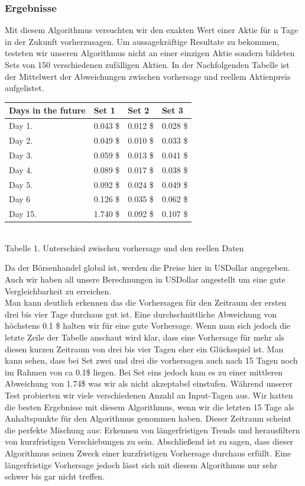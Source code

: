 \documentclass[12pt]{article} %
\begin{document}
\subsubsection{Ergebnisse}

Mit diesem Algorithmus versuchten wir den exakten Wert einer Aktie für n Tage in der Zukunft vorherzusagen. Um aussagekräftige Resultate zu bekommen, testeten wir unseren Algorithmus nicht an einer einzigen Aktie sondern bildeten Sets von 150 verschiedenen zufälligen Aktien. In der Nachfolgenden Tabelle ist der Mittelwert der Abweichungen zwischen vorhersage und reellem Aktienpreis aufgelistet.
\begin{center}
\begin{tabularx}{\textwidth}{|X|X|X|X|}
\hline
Days in the future & Set 1 & Set 2 & Set 3\\
\hline
\hline
Day 1. & 0.043 \$ & 0.012 \$ & 0.028 \$\\
\hline
Day 2. & 0.049 \$ & 0.010 \$ & 0.033 \$\\
\hline
Day 3. & 0.059 \$ & 0.013 \$ & 0.041 \$\\
\hline
Day 4. & 0.089 \$ & 0.017 \$ & 0.038 \$\\
\hline
Day 5. & 0.092 \$ & 0.024 \$ & 0.049 \$\\
\hline
Day 6 & 0.126 \$ & 0.035 \$ & 0.062 \$\\
\hline
\hline
Day 15. & 1.740 \$ & 0.092 \$ & 0.107 \$\\
\hline

\end{tabularx}
\\[5pt]
Tabelle 1. Unterschied zwischen vorhersage und den reellen Daten
\end{center}

Da der Börsenhandel global ist, werden die Preise hier in USDollar angegeben. Auch wir haben all unsere Berechnungen in USDollar angestellt um eine gute Vergleichbarkeit zu erreichen.
\\
Man kann deutlich erkennen das die Vorhersagen für den Zeitraum der ersten drei bis vier Tage durchaus gut ist. Eine durchschnittliche Abweichung von höchstens 0.1 \$ halten wir für eine gute Vorhersage. Wenn man sich jedoch die letzte Zeile der Tabelle anschaut wird klar, dass eine Vorhersage für mehr als diesen kurzen Zeitraum von drei bis vier Tagen eher ein Glücksspiel ist. Man kann sehen, dass bei Set zwei und drei die vorhersagen auch nach 15 Tagen noch im Rahmen von ca 0.1\$ liegen. Bei Set eins jedoch kam es zu einer mittleren Abweichung von 1.74\$ was wir als nicht akzeptabel einstufen. Während unserer Test probierten wir viele verschiedenen Anzahl an Input-Tagen aus. Wir hatten die besten Ergebnisse mit diesem Algorithmus, wenn wir die letzten 15 Tage als Anhaltspunkte für den Algorithmus genommen haben. Dieser Zeitraum scheint die perfekte Mischung aus: Erkennen von längerfristigen Trends und herausfiltern von kurzfristigen Verschiebungen zu sein. Abschließend ist zu sagen, dass dieser Algorithmus seinen Zweck einer kurzfristigen Vorhersage durchaus erfüllt. Eine längerfristige Vorhersage jedoch lässt sich mit diesem Algorithmus nur sehr schwer bis gar nicht treffen.
\end{document}
